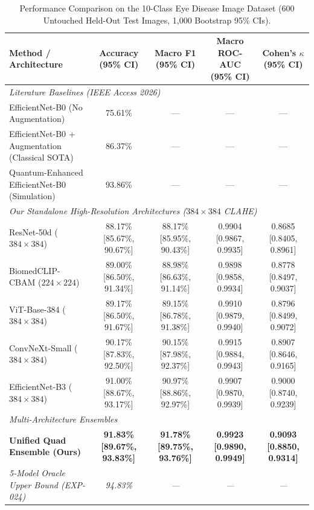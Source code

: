 \begin{table}[t]
\centering
\caption{Performance Comparison on the 10-Class Eye Disease Image Dataset (600 Untouched Held-Out Test Images, 1,000 Bootstrap 95\% CIs).}
\label{tab:10class_benchmarks}
\small
\begin{tabular}{lcccc}
\hline
\textbf{Method / Architecture} & \textbf{Accuracy (95\% CI)} & \textbf{Macro F1 (95\% CI)} & \textbf{Macro ROC-AUC (95\% CI)} & \textbf{Cohen's $\kappa$ (95\% CI)} \\
\hline
\multicolumn{5}{l}{\textit{Literature Baselines (IEEE Access 2026)}} \\
EfficientNet-B0 (No Augmentation) \cite{srivastava2026} & 75.61\% & --- & --- & --- \\
EfficientNet-B0 + Augmentation (Classical SOTA) \cite{srivastava2026} & 86.37\% & --- & --- & --- \\
Quantum-Enhanced EfficientNet-B0 (Simulation) \cite{srivastava2026} & 93.86\% & --- & --- & --- \\
\hline
\multicolumn{5}{l}{\textit{Our Standalone High-Resolution Architectures ($384\times 384$ CLAHE)}} \\
ResNet-50d ($384\times 384$) & 88.17\% [85.67\%, 90.67\%] & 88.17\% [85.95\%, 90.43\%] & 0.9904 [0.9867, 0.9935] & 0.8685 [0.8405, 0.8961] \\
BiomedCLIP-CBAM ($224\times 224$) & 89.00\% [86.50\%, 91.34\%] & 88.98\% [86.63\%, 91.14\%] & 0.9898 [0.9858, 0.9934] & 0.8778 [0.8497, 0.9037] \\
ViT-Base-384 ($384\times 384$) & 89.17\% [86.50\%, 91.67\%] & 89.15\% [86.78\%, 91.38\%] & 0.9910 [0.9879, 0.9940] & 0.8796 [0.8499, 0.9072] \\
ConvNeXt-Small ($384\times 384$) & 90.17\% [87.83\%, 92.50\%] & 90.15\% [87.98\%, 92.37\%] & 0.9915 [0.9884, 0.9943] & 0.8907 [0.8646, 0.9165] \\
EfficientNet-B3 ($384\times 384$) & 91.00\% [88.67\%, 93.17\%] & 90.97\% [88.86\%, 92.97\%] & 0.9907 [0.9870, 0.9939] & 0.9000 [0.8740, 0.9239] \\
\hline
\multicolumn{5}{l}{\textit{Multi-Architecture Ensembles}} \\
\textbf{Unified Quad Ensemble (Ours)} & \textbf{91.83\% [89.67\%, 93.83\%]} & \textbf{91.78\% [89.75\%, 93.76\%]} & \textbf{0.9923 [0.9890, 0.9949]} & \textbf{0.9093 [0.8850, 0.9314]} \\
\textit{5-Model Oracle Upper Bound (EXP-024)} & \textit{94.83\%} & \textit{---} & \textit{---} & \textit{---} \\
\hline
\end{tabular}
\end{table}
